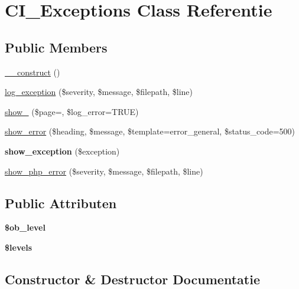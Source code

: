 \hypertarget{class_c_i___exceptions}{}\section{C\+I\+\_\+\+Exceptions Class Referentie}
\label{class_c_i___exceptions}
\subsection*{Public Members}
\begin{DoxyCompactItemize}
\item 
\mbox{\hyperlink{class_c_i___exceptions_a095c5d389db211932136b53f25f39685}{\+\_\+\+\_\+construct}} ()
\item 
\mbox{\hyperlink{class_c_i___exceptions_a477bd3360509887aeb6e0a56bcdcad2a}{log\+\_\+exception}} (\$severity, \$message, \$filepath, \$line)
\item 
\mbox{\hyperlink{class_c_i___exceptions_aaee13338b10f986f23d77eabcaf40fec}{show\+\_}} (\$page=\textquotesingle{}\textquotesingle{}, \$log\+\_\+error=T\+R\+UE)
\item 
\mbox{\hyperlink{class_c_i___exceptions_a4214456af4ed4c4d7a292939dea95257}{show\+\_\+error}} (\$heading, \$message, \$template=\textquotesingle{}error\+\_\+general\textquotesingle{}, \$status\+\_\+code=500)
\item 
\mbox{\label{class_c_i___exceptions_a6ad5ac9b245835caf69b6d3de1f48a85}} 
{\bfseries show\+\_\+exception} (\$exception)
\item 
\mbox{\hyperlink{class_c_i___exceptions_a7962c30cacf1341dac1c44d8ab57cebe}{show\+\_\+php\+\_\+error}} (\$severity, \$message, \$filepath, \$line)
\end{DoxyCompactItemize}
\subsection*{Public Attributen}
\begin{DoxyCompactItemize}
\item 
\mbox{\label{class_c_i___exceptions_abb6b6587dbaf0238bf26829c8df05d59}} 
{\bfseries \$ob\+\_\+level}
\item 
{\bfseries \$levels}
\end{DoxyCompactItemize}


\subsection{Constructor \& Destructor Documentatie}
\mbox{\label{class_c_i___exceptions_a095c5d389db211932136b53f25f39685}} 
